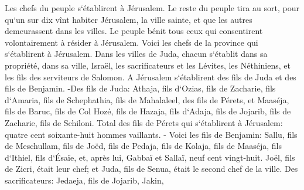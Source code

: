 \verse Les chefs du peuple s`établirent à Jérusalem. Le reste du peuple tira au sort, pour qu`un sur dix vînt habiter Jérusalem, la ville sainte, et que les autres demeurassent dans les villes. 
\verse Le peuple bénit tous ceux qui consentirent volontairement à résider à Jérusalem. 
\verse Voici les chefs de la province qui s`établirent à Jérusalem. Dans les villes de Juda, chacun s`établit dans sa propriété, dans sa ville, Israël, les sacrificateurs et les Lévites, les Néthiniens, et les fils des serviteurs de Salomon. 
\verse A Jérusalem s`établirent des fils de Juda et des fils de Benjamin. -Des fils de Juda: Athaja, fils d`Ozias, fils de Zacharie, fils d`Amaria, fils de Schephathia, fils de Mahalaleel, des fils de Pérets, 
\verse et Maaséja, fils de Baruc, fils de Col Hozé, fils de Hazaja, fils d`Adaja, fils de Jojarib, fils de Zacharie, fils de Schiloni. 
\verse Total des fils de Pérets qui s`établirent à Jérusalem: quatre cent soixante-huit hommes vaillants. - 
\verse Voici les fils de Benjamin: Sallu, fils de Meschullam, fils de Joëd, fils de Pedaja, fils de Kolaja, fils de Maaséja, fils d`Ithiel, fils d`Ésaïe, 
\verse et, après lui, Gabbaï et Sallaï, neuf cent vingt-huit. 
\verse Joël, fils de Zicri, était leur chef; et Juda, fils de Senua, était le second chef de la ville. 
\verse Des sacrificateurs: Jedaeja, fils de Jojarib, Jakin, 
